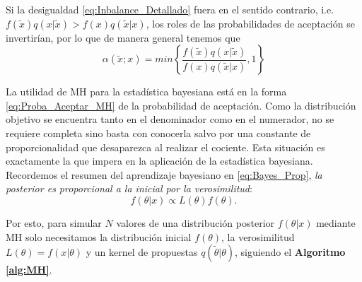 Si la desigualdad \eqref{eq:Inbalance_Detallado} fuera en el sentido contrario, i.e. $f(\tilde{x})q(x|\tilde{x})>f(x)q(\tilde{x}|x)$, los roles de las probabilidades de aceptación se invertirían, por lo que de manera general tenemos que 
\begin{equation}
\label{eq:Proba_Aceptar_MH}
\alpha(\tilde{x};x)=min\left\lbrace\dfrac{f(\tilde{x})q(x|\tilde{x})}{f(x)q(\tilde{x}|x)},1\right\rbrace
\end{equation}

La utilidad de MH para la estadística bayesiana está en la forma \eqref{eq:Proba_Aceptar_MH} de la probabilidad de aceptación. Como la distribución objetivo se encuentra tanto en el denominador como en el numerador, no se requiere completa sino basta con conocerla salvo por una constante de proporcionalidad que desaparezca al realizar el cociente. Esta situación es exactamente la que impera en la aplicación de la estadística bayesiana. Recordemos el resumen del aprendizaje bayesiano en \eqref{eq:Bayes_Prop}, \textit{la posterior es proporcional a la inicial por la verosimilitud}: 
\begin{equation*}
f(\theta|x) \propto L(\theta)f(\theta).
\end{equation*}

Por esto, para simular $N$ valores de una distribución posterior $f(\theta|x)$ mediante MH solo necesitamos la distribución inicial $f(\theta)$, la verosimilitud $L(\theta)=f(x|\theta)$ y un kernel de propuestas $q(\tilde{\theta}|\theta)$, siguiendo el \textbf{Algoritmo \ref{alg:MH}}.\\

